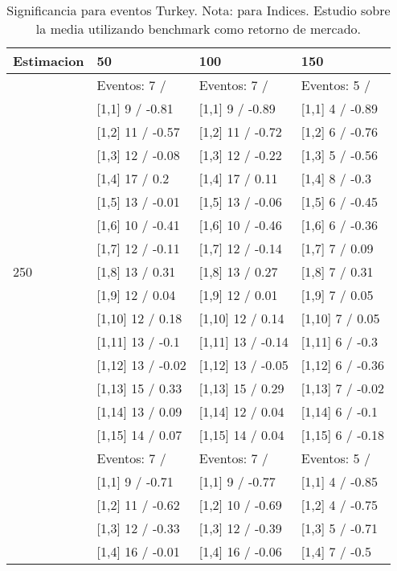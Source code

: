 \begin{table}

\caption{Significancia para eventos Turkey. Nota: para Indices. Estudio sobre la media utilizando benchmark como retorno de mercado.}
\centering
\begin{tabular}[t]{llll}
\toprule
Estimacion & 50 & 100 & 150\\
\midrule
 & Eventos:  7 / & Eventos:  7 / & Eventos:  5 /\\
 & {}[1,1] 9  / -0.81 & {}[1,1] 9  / -0.89 & {}[1,1] 4  / -0.89\\
 & {}[1,2] 11  / -0.57 & {}[1,2] 11  / -0.72 & {}[1,2] 6  / -0.76\\
 & {}[1,3] 12  / -0.08 & {}[1,3] 12  / -0.22 & {}[1,3] 5  / -0.56\\
 & {}[1,4] 17  / 0.2 & {}[1,4] 17  / 0.11 & {}[1,4] 8  / -0.3\\
\addlinespace
 & {}[1,5] 13  / -0.01 & {}[1,5] 13  / -0.06 & {}[1,5] 6  / -0.45\\
 & {}[1,6] 10  / -0.41 & {}[1,6] 10  / -0.46 & {}[1,6] 6  / -0.36\\
 & {}[1,7] 12  / -0.11 & {}[1,7] 12  / -0.14 & {}[1,7] 7  / 0.09\\
250 & {}[1,8] 13  / 0.31 & {}[1,8] 13  / 0.27 & {}[1,8] 7  / 0.31\\
 & {}[1,9] 12  / 0.04 & {}[1,9] 12  / 0.01 & {}[1,9] 7  / 0.05\\
\addlinespace
 & {}[1,10] 12  / 0.18 & {}[1,10] 12  / 0.14 & {}[1,10] 7  / 0.05\\
 & {}[1,11] 13  / -0.1 & {}[1,11] 13  / -0.14 & {}[1,11] 6  / -0.3\\
 & {}[1,12] 13  / -0.02 & {}[1,12] 13  / -0.05 & {}[1,12] 6  / -0.36\\
 & {}[1,13] 15  / 0.33 & {}[1,13] 15  / 0.29 & {}[1,13] 7  / -0.02\\
 & {}[1,14] 13  / 0.09 & {}[1,14] 12  / 0.04 & {}[1,14] 6  / -0.1\\
\addlinespace
 & {}[1,15] 14  / 0.07 & {}[1,15] 14  / 0.04 & {}[1,15] 6  / -0.18\\
 & Eventos:  7 / & Eventos:  7 / & Eventos:  5 /\\
 & {}[1,1] 9  / -0.71 & {}[1,1] 9  / -0.77 & {}[1,1] 4  / -0.85\\
 & {}[1,2] 11  / -0.62 & {}[1,2] 10  / -0.69 & {}[1,2] 4  / -0.75\\
 & {}[1,3] 12  / -0.33 & {}[1,3] 12  / -0.39 & {}[1,3] 5  / -0.71\\
\addlinespace
 & {}[1,4] 16  / -0.01 & {}[1,4] 16  / -0.06 & {}[1,4] 7  / -0.5\\

\end{tabular}
\end{table}
